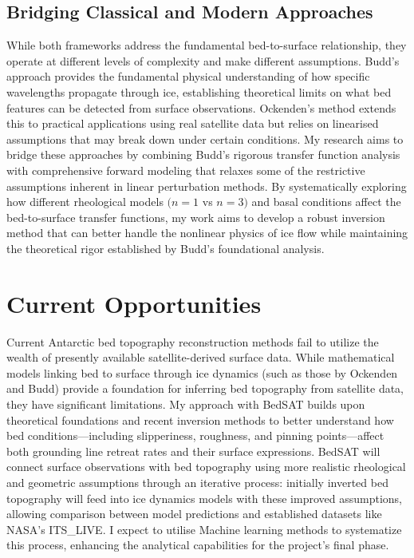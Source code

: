 \subsection{Bridging Classical and Modern Approaches}
While both frameworks address the fundamental bed-to-surface relationship, they operate at different levels of complexity and make different assumptions. Budd's approach provides the fundamental physical understanding of how specific wavelengths propagate through ice, establishing theoretical limits on what bed features can be detected from surface observations. Ockenden's method extends this to practical applications using real satellite data but relies on linearised assumptions that may break down under certain conditions. My research aims to bridge these approaches by combining Budd's rigorous transfer function analysis with comprehensive forward modeling that relaxes some of the restrictive assumptions inherent in linear perturbation methods. By systematically exploring how different rheological models $(n = 1$ vs $n = 3)$ and basal conditions affect the bed-to-surface transfer functions, my work aims to develop a robust inversion method that can better handle the nonlinear physics of ice flow while maintaining the theoretical rigor established by Budd's foundational analysis.

\section{Current Opportunities}
Current Antarctic bed topography reconstruction methods fail to utilize the wealth of presently available satellite-derived surface data. While mathematical models linking bed to surface through ice dynamics (such as those by Ockenden and Budd) provide a foundation for inferring bed topography from satellite data, they have significant limitations. My approach with BedSAT builds upon theoretical foundations and recent inversion methods to better understand how bed conditions—including slipperiness, roughness, and pinning points—affect both grounding line retreat rates and their surface expressions. BedSAT will connect surface observations with bed topography using more realistic rheological and geometric assumptions through an iterative process: initially inverted bed topography will feed into ice dynamics models with these improved assumptions, allowing comparison between model predictions and established datasets like NASA's ITS\_LIVE. I expect to utilise Machine learning methods to systematize this process, enhancing the analytical capabilities for the project's final phase.
